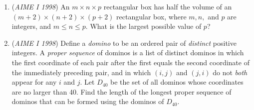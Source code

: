 \begin{enumerate}
	\item (\textit{AIME I 1998}) An $m\times n\times p$ rectangular box has half the volume of an $(m + 2)\times(n + 2)\times(p + 2)$ rectangular box, where $m, n,$ and $p$ are integers, and $m\le n\le p.$  What is the largest possible value of $p$?


 

	\item (\textit{AIME I 1998}) Define a \textit{domino} to be an ordered pair of \textit{distinct} positive integers. A \textit{proper sequence} of dominos is a list of distinct dominos in which the first coordinate of each pair after the first equals the second coordinate of the immediately preceding pair, and in which $(i,j)$ and $(j,i)$ do not \textit{both} appear for any $i$ and $j$.  Let $D_{40}$ be the set of all dominos whose coordinates are no larger than 40.  Find the length of the longest proper sequence of dominos that can be formed using the dominos of $D_{40}.$


\end{enumerate}